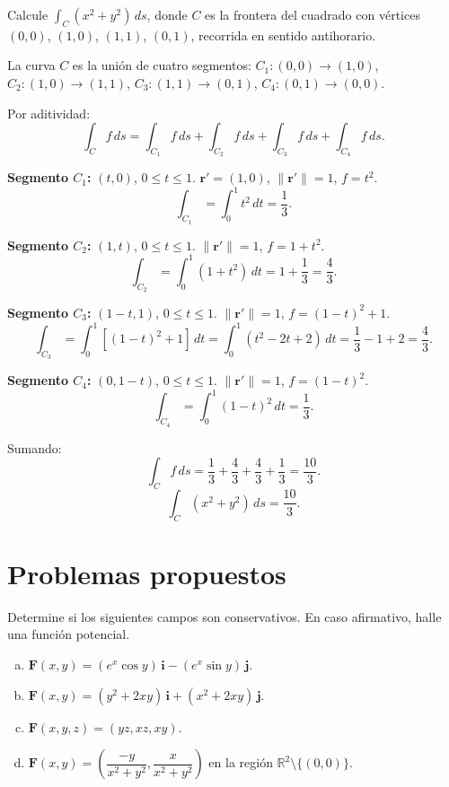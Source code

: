 \begin{example}
Calcule \(\displaystyle \int_C (x^2 + y^2)\,ds\), donde \(C\) es la
frontera del cuadrado con vértices \((0,0)\), \((1,0)\), \((1,1)\),
\((0,1)\), recorrida en sentido antihorario.
\begin{myproof}
La curva \(C\) es la unión de cuatro segmentos:
\(C_1: (0,0)\to(1,0)\), \(C_2: (1,0)\to(1,1)\),
\(C_3: (1,1)\to(0,1)\), \(C_4: (0,1)\to(0,0)\).

Por aditividad:
\[
\int_C f\,ds = \int_{C_1} f\,ds + \int_{C_2} f\,ds
+ \int_{C_3} f\,ds + \int_{C_4} f\,ds.
\]

\textbf{Segmento \(C_1\):} \((t,0)\), \(0\le t\le 1\).
\(\mathbf{r}'=(1,0)\), \(\|\mathbf{r}'\|=1\), \(f=t^2\).
\[
\int_{C_1} = \int_0^1 t^2\,dt = \frac{1}{3}.
\]

\textbf{Segmento \(C_2\):} \((1,t)\), \(0\le t\le 1\).
\(\|\mathbf{r}'\|=1\), \(f=1+t^2\).
\[
\int_{C_2} = \int_0^1 (1+t^2)\,dt = 1 + \frac{1}{3} = \frac{4}{3}.
\]

\textbf{Segmento \(C_3\):} \((1-t,1)\), \(0\le t\le 1\).
\(\|\mathbf{r}'\|=1\), \(f=(1-t)^2+1\).
\[
\int_{C_3} = \int_0^1 [(1-t)^2 + 1]\,dt
= \int_0^1 (t^2 - 2t + 2)\,dt
= \frac{1}{3} - 1 + 2 = \frac{4}{3}.
\]

\textbf{Segmento \(C_4\):} \((0,1-t)\), \(0\le t\le 1\).
\(\|\mathbf{r}'\|=1\), \(f=(1-t)^2\).
\[
\int_{C_4} = \int_0^1 (1-t)^2\,dt = \frac{1}{3}.
\]

Sumando:
\[
\int_C f\,ds = \frac{1}{3} + \frac{4}{3} + \frac{4}{3} + \frac{1}{3}
= \frac{10}{3}.
\]
\[
\boxed{\int_C (x^2+y^2)\,ds = \frac{10}{3}}.
\]
\end{myproof}
\end{example}

\section{Problemas propuestos}

\begin{prob}
Determine si los siguientes campos son conservativos. En caso
afirmativo, halle una función potencial.
\begin{enumerate}[a)]
  \item \(\mathbf{F}(x,y) = (e^x \cos y)\,\mathbf{i} - (e^x \sin y)\,\mathbf{j}\).
  \item \(\mathbf{F}(x,y) = (y^2 + 2xy)\,\mathbf{i} + (x^2 + 2xy)\,\mathbf{j}\).
  \item \(\mathbf{F}(x,y,z) = (yz, xz, xy)\).
  \item \(\mathbf{F}(x,y) = \left(\dfrac{-y}{x^2+y^2},
  \dfrac{x}{x^2+y^2}\right)\) en la región \(\mathbb{R}^2 \setminus \{(0,0)\}\).
\end{enumerate}
\end{prob}

